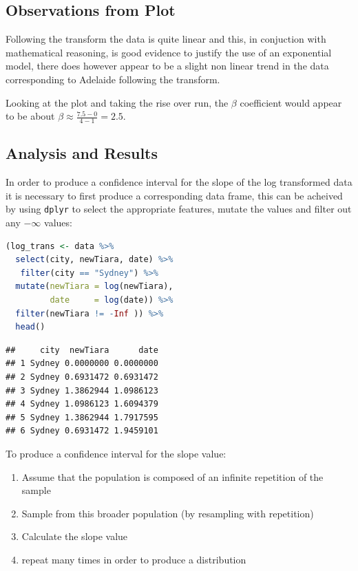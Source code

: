 \documentclass{article}
\newcommand{\passthrough}[1]{#1}
\providecommand{\tightlist}{%
  \setlength{\itemsep}{0pt}\setlength{\parskip}{0pt}}
\begin{document}
\hypertarget{observations-from-plot-3}{%
\subsection{Observations from Plot}\label{observations-from-plot-3}}

Following the transform the data is quite linear and this, in conjuction
with mathematical reasoning, is good evidence to justify the use of an
exponential model, there does however appear to be a slight non linear
trend in the data corresponding to Adelaide following the transform.

Looking at the plot and taking the rise over run, the \(\beta\)
coefficient would appear to be about
\(\beta \approx \frac{7.5-0}{4-1} = 2.5\).

\hypertarget{analysis-and-results-3}{%
\subsection{Analysis and Results}\label{analysis-and-results-3}}

In order to produce a confidence interval for the slope of the log
transformed data it is necessary to first produce a corresponding data
frame, this can be acheived by using \passthrough{\lstinline!dplyr!} to
select the appropriate features, mutate the values and filter out any
\(-\infty\) values:

\begin{lstlisting}[language=R]
(log_trans <- data %>%
  select(city, newTiara, date) %>%
   filter(city == "Sydney") %>%
  mutate(newTiara = log(newTiara),
         date     = log(date)) %>%
  filter(newTiara != -Inf )) %>%
  head()
\end{lstlisting}

\begin{lstlisting}
##     city  newTiara      date
## 1 Sydney 0.0000000 0.0000000
## 2 Sydney 0.6931472 0.6931472
## 3 Sydney 1.3862944 1.0986123
## 4 Sydney 1.0986123 1.6094379
## 5 Sydney 1.3862944 1.7917595
## 6 Sydney 0.6931472 1.9459101
\end{lstlisting}

To produce a confidence interval for the slope value:

\begin{enumerate}
\def\labelenumi{\arabic{enumi}.}
\tightlist
\item
  Assume that the population is composed of an infinite repetition of
  the sample
\item
  Sample from this broader population (by resampling with repetition)
\item
  Calculate the slope value
\item
  repeat many times in order to produce a distribution
\end{enumerate}
\end{document}

